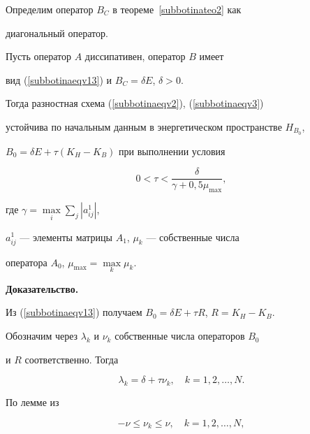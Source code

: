 Определим оператор $B_C$ в теореме~\ref{subbotinateo2} как 


диагональный оператор.





\begin{cornonum}


Пусть оператор $A$ диссипативен, оператор $B$ имеет 


вид (\ref{subbotinaeqv13}) и $B_C=\delta E$, $\delta >0$.


Тогда разностная схема (\ref{subbotinaeqv2}), (\ref{subbotinaeqv3}) 


устойчива по начальным данным в энергетическом пространстве $H_{B_0}$,


$B_0=\delta E+\tau \left({K_H - K_B} \right)$ при выполнении условия


\begin{equation} \label{subbotinaeqv14}


0<\tau <\frac{\delta}{\gamma +0{,}5\mu_{\max}},


\end{equation}


где $\gamma =\max\limits_i \sum\limits_j {| {a^1 _{ij} } |}$,


$a^1 _{ij}$ --- элементы матрицы $A_1$, $\mu_k$ --- собственные числа 


оператора $A_0$, $\mu _{\max } =\max\limits_k \mu _k$.


\end{cornonum}





{\bf Доказательство.}


Из (\ref{subbotinaeqv13}) получаем $B_0=\delta E+\tau R$, $R=K_H - K_B$. 


Обозначим через $\lambda_k$ и $\nu_k$ собственные числа операторов $B_0$ 


и $R$ соответственно. Тогда


\begin{equation} \label{subbotinaeqv15}


\lambda_k =\delta +\tau \nu_k, \quad k=1,2,\dotsc,N.


\end{equation}


По лемме из \cite{subbotinabib9}


\begin{equation} \label{subbotinaeqv16}


-\nu \le \nu_k \le \nu, \quad k=1,2,\dotsc,N,


\end{equation}


